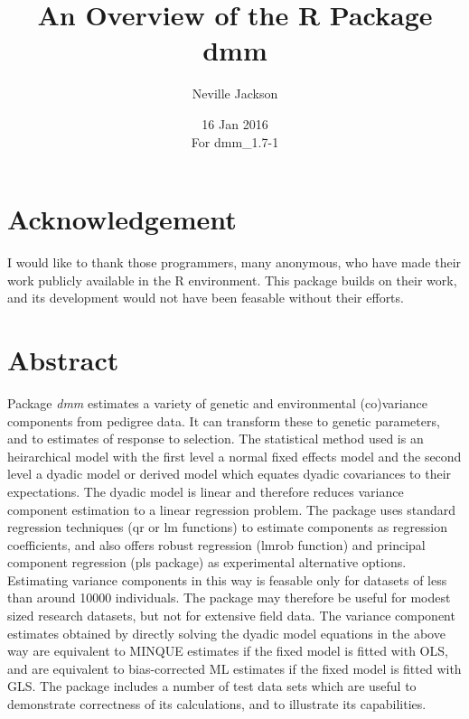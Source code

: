 \documentclass[titlepage]{article}  %
\title{ An Overview of the R Package dmm}
\author{Neville Jackson }
\date{16 Jan 2016 \\
      For dmm\_1.7-1}   %
\begin{document}
 
 
\maketitle      
\tableofcontents

\clearpage
\section{Acknowledgement}
 I would like to thank those programmers, many anonymous, who have made their work
publicly available in the R environment. This package builds on their work, and its
 development would not have been feasable without their efforts.

\clearpage
\section{Abstract}
 Package {\em dmm} estimates a variety of genetic and environmental (co)variance
components from pedigree data. It can transform these to genetic parameters, and to estimates of response to selection. The statistical method used is an heirarchical model with the first level a normal fixed effects model and the second level a dyadic model or derived model which equates dyadic covariances to their expectations. The dyadic model is linear and therefore reduces variance component estimation to a linear regression problem. 
The package uses standard regression techniques (qr or lm functions) to estimate components as regression coefficients, and also offers robust regression (lmrob function) and principal component regression (pls package) as experimental alternative options.
Estimating variance components in this way is feasable only for datasets of less than around 10000 individuals. The package may therefore be useful for modest sized research datasets, but not for extensive field data. The variance component estimates obtained by directly solving the dyadic model equations in the above way are equivalent to MINQUE estimates if the fixed model is fitted with OLS, and are equivalent to bias-corrected ML estimates if the fixed model is fitted with GLS. The package includes a number of test data sets which are useful to demonstrate correctness of its calculations, and to illustrate its capabilities.

\clearpage
\end{document}
